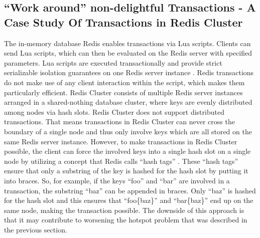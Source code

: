 \subsection{“Work around” non-delightful Transactions - A Case Study Of Transactions in Redis Cluster}
The in-memory database Redis enables transactions via Lua scripts. Clients can send Lua scripts, which can then be evaluated on the Redis server with specified parameters. Lua scripts are executed transactionally and provide strict serializable isolation guarantees on one Redis server instance \cite{redislabs:rollback}. Redis transactions do not make use of any client interaction within the script, which makes them particularly efficient.
Redis Cluster consists of multiple Redis server instances arranged in a shared-nothing database cluster, where keys are evenly distributed among nodes via hash slots. Redis Cluster does not support distributed transactions. That means transactions in Redis Cluster can never cross the boundary of a single node and thus only involve keys which are all stored on the same Redis server instance. However, to make transactions in Redis Cluster possible, the client can force the involved keys into a single hash slot on a single node by utilizing a concept that Redis calls “hash tags” \cite{redis:cluster}. These “hash tags” ensure that only a substring of the key is hashed for the hash slot by putting it into braces. So, for example, if the keys “foo” and “bar” are involved in a transaction, the substring “baz” can be appended in braces. Only “baz” is hashed for the hash slot and this ensures that “foo\{baz\}” and “bar\{baz\}” end up on the same node, making the transaction possible. The downside of this approach is that it may contribute to worsening the hotspot problem that was described in the previous section.

